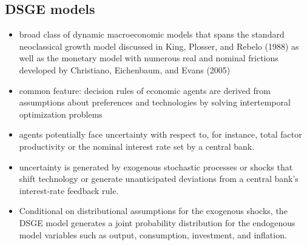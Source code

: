 \documentclass[]{scrartcl}
\begin{document}
\subsection{DSGE models}
\begin{itemize}
	\item broad class of dynamic macroeconomic models that spans the standard neoclassical growth model discussed in King, Plosser, and Rebelo (1988) as well as the monetary model with numerous real and nominal frictions developed by Christiano, Eichenbaum, and Evans (2005)
	\item common feature: decision rules of economic agents are derived from assumptions about preferences and technologies by solving intertemporal optimization problems
	\item agents potentially face uncertainty with respect to, for instance, total factor productivity or the nominal interest rate set by a central bank.
	\item uncertainty is generated by exogenous stochastic processes or shocks that shift technology or generate unanticipated deviations from a central bank’s interest-rate feedback rule. 
	\item Conditional on distributional assumptions for the exogenous shocks, the DSGE model generates a joint probability distribution for the endogenous model variables such as output, consumption, investment, and inflation.
\end{itemize}
\end{document}

